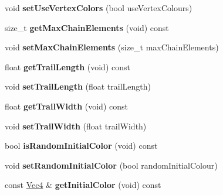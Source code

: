 \begin{DoxyCompactItemize}
\item 
\mbox{\label{classPURibbonTrailRender_a657f9b7a4fc70398511f1b4c250a70dc}} 
void {\bfseries set\+Use\+Vertex\+Colors} (bool use\+Vertex\+Colours)
\item 
\mbox{\label{classPURibbonTrailRender_a07e286610f4360490a2af27d06f64607}} 
size\+\_\+t {\bfseries get\+Max\+Chain\+Elements} (void) const
\item 
\mbox{\label{classPURibbonTrailRender_a456d124c1984a53bc4c59238b0533745}} 
void {\bfseries set\+Max\+Chain\+Elements} (size\+\_\+t max\+Chain\+Elements)
\item 
\mbox{\label{classPURibbonTrailRender_ab643669b44caf3cc79024f79113b350e}} 
float {\bfseries get\+Trail\+Length} (void) const
\item 
\mbox{\label{classPURibbonTrailRender_a92ce4592f99d7429c774dde21682ffac}} 
void {\bfseries set\+Trail\+Length} (float trail\+Length)
\item 
\mbox{\label{classPURibbonTrailRender_a001b396c4f964a31912d315f159a551d}} 
float {\bfseries get\+Trail\+Width} (void) const
\item 
\mbox{\label{classPURibbonTrailRender_a8cf9b2e330d3ad341c123bb0227bfd07}} 
void {\bfseries set\+Trail\+Width} (float trail\+Width)
\item 
\mbox{\label{classPURibbonTrailRender_a55ef0d1c86d44d02169dbbe304e8270a}} 
bool {\bfseries is\+Random\+Initial\+Color} (void) const
\item 
\mbox{\label{classPURibbonTrailRender_a25e825a8ab5e5521bbfbbd7ca1b62cd3}} 
void {\bfseries set\+Random\+Initial\+Color} (bool random\+Initial\+Colour)
\item 
\mbox{\label{classPURibbonTrailRender_a74fd5ae6f6152a1afe029cca09abd05d}} 
const \hyperlink{classVec4}{Vec4} \& {\bfseries get\+Initial\+Color} (void) const
\item 

\end{DoxyCompactItemize}
